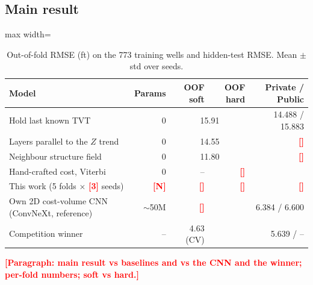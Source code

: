\documentclass[preprint,12pt,authoryear]{elsarticle}
\newcommand{\PH}[1]{\textcolor{red}{\textbf{[#1]}}}
\begin{document}
\subsection{Main result}
\begin{table}[!htbp]\centering\small
\caption{Out-of-fold RMSE (ft) on the 773 training wells and hidden-test RMSE. Mean $\pm$ std over seeds.}\label{tab:main}
\begin{adjustbox}{max width=\linewidth}
\begin{tabular}{lrrrr}
\toprule
Model & Params & OOF soft & OOF hard & Private / Public \\
\midrule
Hold last known TVT & 0 & \multicolumn{2}{c}{15.91} & 14.488 / 15.883 \\
Layers parallel to the $Z$ trend & 0 & \multicolumn{2}{c}{14.55} & \PH{} \\
Neighbour structure field & 0 & \multicolumn{2}{c}{11.80} & \PH{} \\
Hand-crafted cost, Viterbi & 0 & -- & \PH{} & \\
\midrule
This work (5 folds $\times$ \PH{3} seeds) & \PH{N} & \PH{} & \PH{} & \PH{} \\
\midrule
Own 2D cost-volume CNN (ConvNeXt, reference) & ${\sim}$50M & \PH{} & & 6.384 / 6.600 \\
Competition winner \citep{rogii1st} & -- & 4.63 (CV) & & 5.639 / -- \\
\bottomrule
\end{tabular}
\end{adjustbox}
\end{table}

\PH{Paragraph: main result vs baselines and vs the CNN and the winner; per-fold numbers; soft vs hard.}
\end{document}
